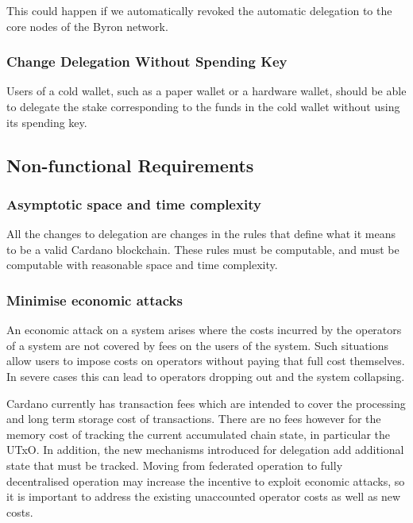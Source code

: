 \documentclass[11pt,a4paper,dvipsnames,twosided]{article}
\begin{document}
This could happen if we automatically revoked the automatic delegation
to the core nodes of the Byron network.

\subsubsection{Change Delegation Without Spending Key}
\label{change-delegation-without-spending-key}

Users of a cold wallet, such as a paper wallet or a hardware wallet,
should be able to delegate the stake corresponding to the funds in the
cold wallet without using its spending key.

\subsection{Non-functional Requirements}
\label{non-functional-requirements}

\subsubsection{Asymptotic space and time complexity}
\label{asymptotic-space-and-time-complexity}

All the changes to delegation are changes in the rules that define what
it means to be a valid Cardano blockchain. These rules must be
computable, and must be computable with reasonable space and time
complexity.

\subsubsection{Minimise economic attacks}
\label{minimise-economic-attacks}

An economic attack on a system arises where the costs incurred by the
operators of a system are not covered by fees on the users of the
system. Such situations allow users to impose costs on operators without
paying that full cost themselves. In severe cases this can lead to
operators dropping out and the system collapsing.

Cardano currently has transaction fees which are intended to cover the
processing and long term storage cost of transactions. There are no fees
however for the memory cost of tracking the current accumulated chain
state, in particular the UTxO. In addition, the new mechanisms
introduced for delegation add additional state that must be tracked.
Moving from federated operation to fully decentralised operation may
increase the incentive to exploit economic attacks, so it is important
to address the existing unaccounted operator costs as well as new costs.
\end{document}
